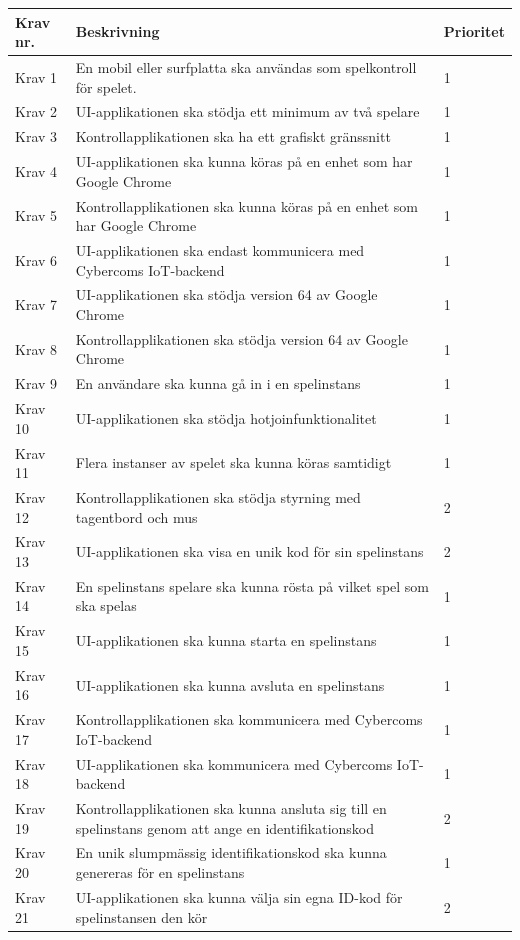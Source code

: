 \documentclass[10pt]{article}
\begin{document}
	\begin{tabular}{| p{2cm} | p{8cm} | p{2cm}|}
		\hline
		
		\textbf{Krav nr.} & \textbf{Beskrivning} &\textbf{Prioritet} \\ \hline
		Krav 1 & En mobil eller surfplatta ska användas som spelkontroll för spelet. & 1 \\ \hline
		Krav 2 & UI-applikationen ska stödja ett minimum av två spelare & 1 \\ \hline
		Krav 3 & Kontrollapplikationen ska ha ett grafiskt gränssnitt   & 1 \\ \hline
		Krav 4 & UI-applikationen ska kunna köras på en enhet som har Google Chrome & 1 \\ \hline
		Krav 5 & Kontrollapplikationen ska kunna köras på en enhet som har Google Chrome & 1 \\ \hline
		Krav 6 & UI-applikationen ska endast kommunicera med \newline Cybercoms IoT-backend & 1 \\ \hline
		Krav 7 & UI-applikationen ska stödja version 64 av Google Chrome & 1 \\ \hline
		Krav 8 & Kontrollapplikationen ska stödja version 64 av Google Chrome & 1 \\ \hline
		Krav 9 & En användare ska kunna gå in i en spelinstans & 1 \\ \hline
		Krav 10 & UI-applikationen ska stödja hotjoinfunktionalitet & 1 \\ \hline
		Krav 11 & Flera instanser av spelet ska kunna köras samtidigt & 1 \\ \hline
		Krav 12 & Kontrollapplikationen ska stödja styrning med tagentbord och mus & 2 \\ \hline
		Krav 13 & UI-applikationen ska visa en unik kod för sin spelinstans & 2 \\ \hline
		Krav 14 & En spelinstans spelare ska kunna rösta på vilket spel som ska spelas & 1 \\ \hline
		Krav 15 & UI-applikationen ska kunna starta en spelinstans & 1 \\ \hline
		Krav 16 & UI-applikationen ska kunna avsluta en spelinstans & 1 \\ \hline
		Krav 17 & Kontrollapplikationen ska kommunicera med Cybercoms IoT-backend & 1 \\ \hline
		Krav 18 & UI-applikationen ska kommunicera med Cybercoms IoT-backend & 1\\ \hline
		Krav 19 & Kontrollapplikationen ska kunna ansluta sig till en spelinstans genom att ange en identifikationskod & 2 \\ \hline
		Krav 20 & En unik slumpmässig identifikationskod ska kunna genereras för en spelinstans & 1 \\ \hline
		Krav 21 & UI-applikationen ska kunna välja sin egna ID-kod för spelinstansen den kör & 2 \\ \hline
		
		
		
	\end{tabular}
	
\end{document}
